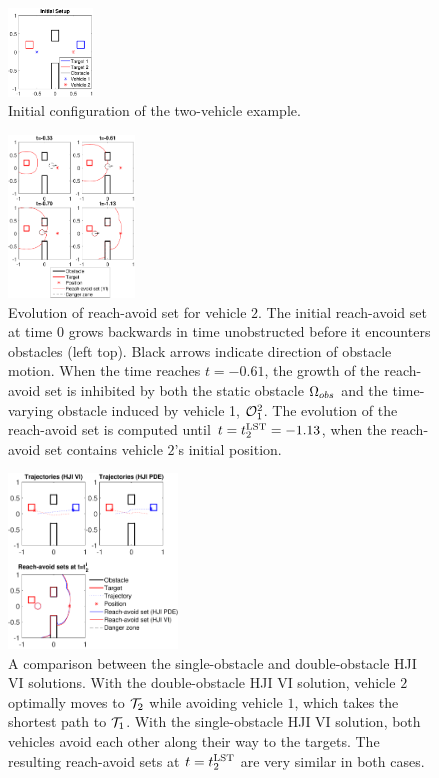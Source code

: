 \documentclass[letterpaper, 10pt, conference]{ieeeconf}      %
\begin{document}
\begin{figure}
	\centering
	\includegraphics[width=0.2\textwidth]{"kin_ic"}
	\caption{Initial configuration of the two-vehicle example.}
	\label{fig:kin_ic}
\end{figure}

\begin{figure}
	\centering
	\includegraphics[width=0.3\textwidth]{"kin_reach"}
	\caption{Evolution of reach-avoid set for vehicle $2$. The initial reach-avoid set at time 0 grows backwards in time unobstructed before it encounters obstacles (left top). Black arrows indicate direction of obstacle motion. When the time reaches $t=-0.61$, the growth of the reach-avoid set is inhibited by both the static obstacle $\Omega_{obs}$ and the time-varying obstacle induced by vehicle 1, $\mathcal{O}_1^2$. The evolution of the reach-avoid set is computed until $t=t^{\text{LST}}_2=-1.13$, when the reach-avoid set contains vehicle $2$'s initial position.}
	\label{fig:kin_reach}
\end{figure}

\begin{figure}
	\centering
	\includegraphics[width=0.4\textwidth]{"kin_result"}
	\caption{A comparison between the single-obstacle and double-obstacle HJI VI solutions. With the double-obstacle HJI VI solution, vehicle $2$ optimally moves to $\mathcal{T}_2$ while avoiding vehicle $1$, which takes the shortest path to $\mathcal{T}_1$. With the single-obstacle HJI VI solution, both vehicles avoid each other along their way to the targets. The resulting reach-avoid sets at $t=t^{\text{LST}}_2$ are very similar in both cases.}
	\label{fig:kin_result}
\end{figure}
\end{document}
